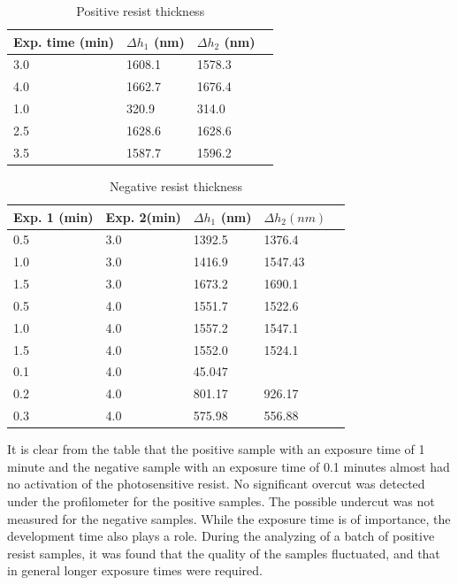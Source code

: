 \begin{table}[H]
    \centering
    \caption{Positive resist thickness}
    \begin{tabular}{X l l l}
        Exp. time (min)& $\Delta h_1$ (nm)& $\Delta h_2$ (nm) \\ 
        \hline\hline
        3.0 & 1608.1  &   1578.3  \\
        4.0 & 1662.7  &   1676.4  \\
        1.0 & 320.9   &   314.0   \\
        2.5 & 1628.6  &   1628.6  \\
        3.5 & 1587.7  &   1596.2  \\
        \hline
    \end{tabular}
    \label{tab:pos_profile}
\end{table}

\begin{table}[H]
    \centering
    \caption{Negative resist thickness}
    \begin{tabular}{X l l l l}
	Exp. 1 (min) & Exp. 2(min)& $\Delta h_1$ (nm) & $\Delta h_2 (nm)$ \\ 
        \hline\hline
        0.5 & 3.0 & 1392.5  &   1376.4  \\
        1.0 & 3.0 & 1416.9  &   1547.43 \\
        1.5 & 3.0 & 1673.2  &   1690.1  \\
        0.5 & 4.0 & 1551.7  &   1522.6  \\
        1.0 & 4.0 & 1557.2  &   1547.1  \\
        1.5 & 4.0 & 1552.0  &   1524.1  \\
        0.1 & 4.0 & 45.047  &   ~       \\
        0.2 & 4.0 & 801.17  &   926.17  \\
        0.3 & 4.0 & 575.98  &   556.88  \\
        \hline
    \end{tabular}
    \label{tab:neg_profile}
\end{table}

It is clear from the table that the positive sample with an exposure time of  1 minute and the negative sample with an exposure time of 0.1 minutes almost had no activation of the photosensitive resist. No significant overcut was detected under the profilometer for the positive samples. The possible undercut was not measured for the negative samples.
While the exposure time is of importance, the development time also plays a role. During the analyzing of a batch of positive resist samples, it was found that the quality of the samples fluctuated, and that in general longer exposure times were required. 


